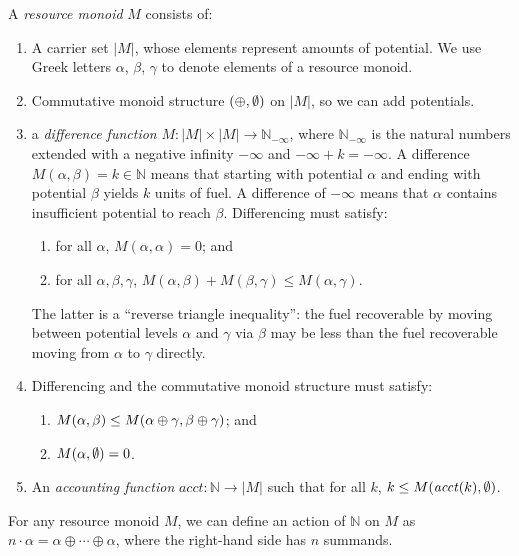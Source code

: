 \documentclass[acmsmall,screen]{acmart}
\newcommand{\natinf}{\mathbb{N}_{-\infty}}
\begin{document}
\begin{definition}
  A \emph{resource monoid} $M$ consists of:
  \begin{enumerate}
  \item A carrier set $|M|$, whose elements represent amounts of
    potential. We use Greek letters $\alpha$, $\beta$, $\gamma$ to
    denote elements of a resource monoid.
  \item Commutative monoid structure $(\oplus,\emptyset)$ on $|M|$, so
    we can add potentials.
  \item a \emph{difference function} $M : |M| \times |M| \to \natinf$,
    where $\natinf$ is the natural numbers extended with a negative
    infinity $- \infty$ and $- \infty + k = -\infty$. A difference
    $M(\alpha, \beta) = k \in \mathbb{N}$ means that starting with
    potential $\alpha$ and ending with potential $\beta$ yields $k$
    units of fuel. A difference of $- \infty$ means that $\alpha$
    contains insufficient potential to reach $\beta$. Differencing
    must satisfy:
    \begin{enumerate}
    \item for all $\alpha$, $M(\alpha,\alpha) = 0$; and
    \item for all $\alpha, \beta, \gamma$,
      $M(\alpha, \beta) + M(\beta, \gamma) \leq M(\alpha, \gamma)$.
    \end{enumerate}
    The latter is a ``reverse triangle inequality'': the fuel
    recoverable by moving between potential levels $\alpha$ and
    $\gamma$ via $\beta$ may be less than the fuel recoverable
    moving from $\alpha$ to $\gamma$ directly.
  \item Differencing and the commutative monoid structure must satisfy:
    \begin{enumerate}
    \item $M(\alpha, \beta) \leq M(\alpha \oplus \gamma, \beta \oplus \gamma)$; and
    \item $M(\alpha, \emptyset) = 0$.
    \end{enumerate}
  \item An \emph{accounting function}
    $\mathit{acct} : \mathbb{N} \to |M|$ such that for all $k$,
    $k \leq M(\mathit{acct}(k),\emptyset)$.
  \end{enumerate}
\end{definition}

For any resource monoid $M$, we can define an action of $\mathbb{N}$
on $M$ as $n \cdot \alpha = \alpha \oplus \cdots \oplus \alpha$, where
the right-hand side has $n$ summands.
\end{document}
